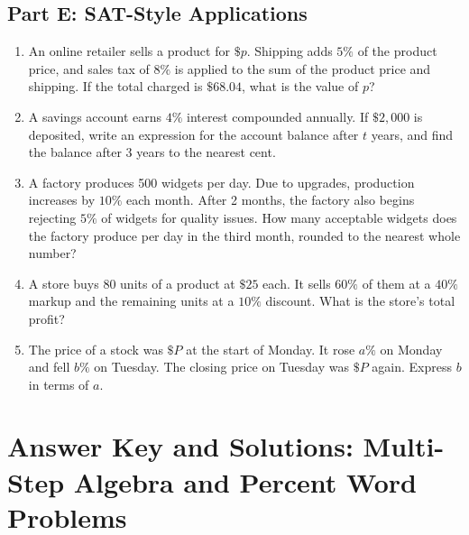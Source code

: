 \documentclass[14pt]{extarticle}
\begin{document}
\subsection*{Part E: SAT-Style Applications}
\begin{enumerate}
  \item An online retailer sells a product for \(\$p\). Shipping adds \(5\%\) of the product price, and sales tax of \(8\%\) is applied to the sum of the product price and shipping. If the total charged is \(\$68.04\), what is the value of \(p\)?
  \item A savings account earns \(4\%\) interest compounded annually. If \(\$2{,}000\) is deposited, write an expression for the account balance after \(t\) years, and find the balance after 3 years to the nearest cent.
  \item A factory produces 500 widgets per day. Due to upgrades, production increases by \(10\%\) each month. After 2 months, the factory also begins rejecting \(5\%\) of widgets for quality issues. How many acceptable widgets does the factory produce per day in the third month, rounded to the nearest whole number?
  \item A store buys 80 units of a product at \(\$25\) each. It sells \(60\%\) of them at a \(40\%\) markup and the remaining units at a \(10\%\) discount. What is the store's total profit?
  \item The price of a stock was \(\$P\) at the start of Monday. It rose \(a\%\) on Monday and fell \(b\%\) on Tuesday. The closing price on Tuesday was \(\$P\) again. Express \(b\) in terms of \(a\).
\end{enumerate}

\newpage

\section*{Answer Key and Solutions: Multi-Step Algebra and Percent Word Problems}
\end{document}

